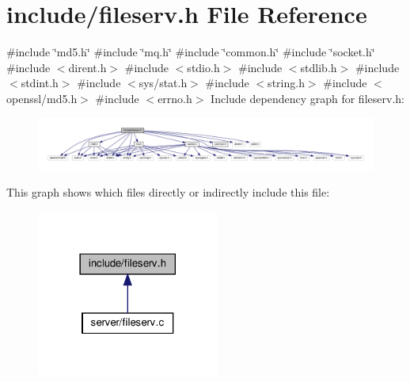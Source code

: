 \section{include/fileserv.h File Reference}
\label{fileserv_8h}
{\ttfamily \#include \char`\"{}md5.\+h\char`\"{}}\newline
{\ttfamily \#include \char`\"{}mq.\+h\char`\"{}}\newline
{\ttfamily \#include \char`\"{}common.\+h\char`\"{}}\newline
{\ttfamily \#include \char`\"{}socket.\+h\char`\"{}}\newline
{\ttfamily \#include $<$dirent.\+h$>$}\newline
{\ttfamily \#include $<$stdio.\+h$>$}\newline
{\ttfamily \#include $<$stdlib.\+h$>$}\newline
{\ttfamily \#include $<$stdint.\+h$>$}\newline
{\ttfamily \#include $<$sys/stat.\+h$>$}\newline
{\ttfamily \#include $<$string.\+h$>$}\newline
{\ttfamily \#include $<$openssl/md5.\+h$>$}\newline
{\ttfamily \#include $<$errno.\+h$>$}\newline
Include dependency graph for fileserv.\+h\+:
\nopagebreak
\begin{figure}[H]
\begin{center}
\leavevmode
\includegraphics[width=350pt]{fileserv_8h__incl}
\end{center}
\end{figure}
This graph shows which files directly or indirectly include this file\+:
\nopagebreak
\begin{figure}[H]
\begin{center}
\leavevmode
\includegraphics[width=170pt]{fileserv_8h__dep__incl}
\end{center}
\end{figure}
